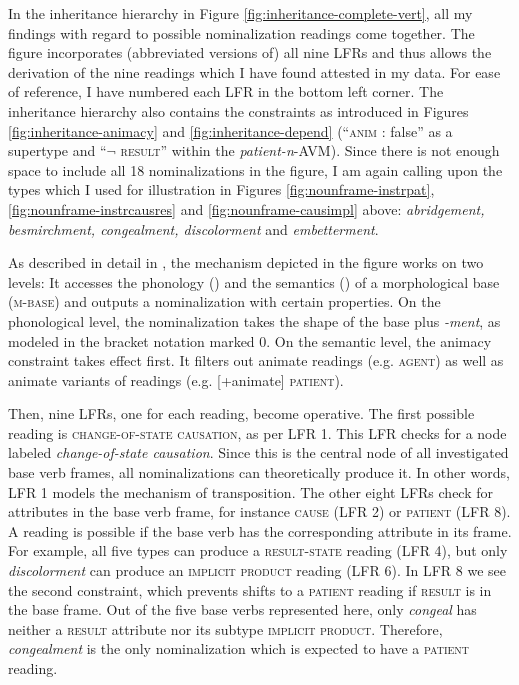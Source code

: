 In the inheritance hierarchy in Figure \ref{fig:inheritance-complete-vert}, all my findings with regard to possible nominalization readings come together. 
The figure incorporates (abbreviated versions of) all nine LFRs and thus allows the derivation of the nine readings which I have found attested in my data. For ease of reference, I have numbered each LFR in the bottom left corner.  
The inheritance hierarchy also contains the constraints as introduced in Figures \ref{fig:inheritance-animacy} and \ref{fig:inheritance-depend} (``\textsc{anim :} false'' as a supertype and ``$\neg$ \textsc{result}'' within the \textit{patient-n}-AVM). 
Since there is not enough space to include all 18 nominalizations in the figure, I am again calling upon the types which I used for illustration in Figures \ref{fig:nounframe-instrpat}, \ref{fig:nounframe-instrcausres} and \ref{fig:nounframe-causimpl} above: \textit{abridgement, besmirchment, congealment, discolorment} and \textit{embetterment}.

As described in detail in , the mechanism depicted in the figure works on two levels: It accesses the phonology () and the semantics () of a morphological base (\textsc{m-base}) and outputs a nominalization with certain properties. 
On the phonological level, the nominalization takes the shape of the base plus \textit{-ment}, as modeled in the bracket notation marked 0. 
On the semantic level, the animacy constraint takes effect first. It filters out animate readings (e.g. \textsc{agent}) as well as animate variants of readings (e.g. [+animate] \textsc{patient}).

Then, nine LFRs, one for each reading, become operative. The first possible reading is \textsc{change-of-state causation}, as per LFR 1. This LFR checks for a node labeled \textit{change-of-state causation}. Since this is the central node of all investigated base verb frames, all nominalizations can theoretically produce it. In other words, LFR 1 models the mechanism of transposition. 
The other eight LFRs check for attributes in the base verb frame, for instance \textsc{cause} (LFR 2) or \textsc{patient} (LFR 8). A reading is possible if the base verb has the corresponding attribute in its frame. For example, all five types can produce a \textsc{result-state} reading (LFR 4), but only \textit{discolorment} can produce an \textsc{implicit product} reading (LFR 6). In LFR 8 we see the second constraint, which prevents shifts to a \textsc{patient} reading if \textsc{result} is in the base frame. Out of the five base verbs represented here, only \textit{congeal} has neither a \textsc{result} attribute nor its subtype \textsc{implicit product}. Therefore, \textit{congealment} is the only nominalization which is expected to have a \textsc{patient} reading.

